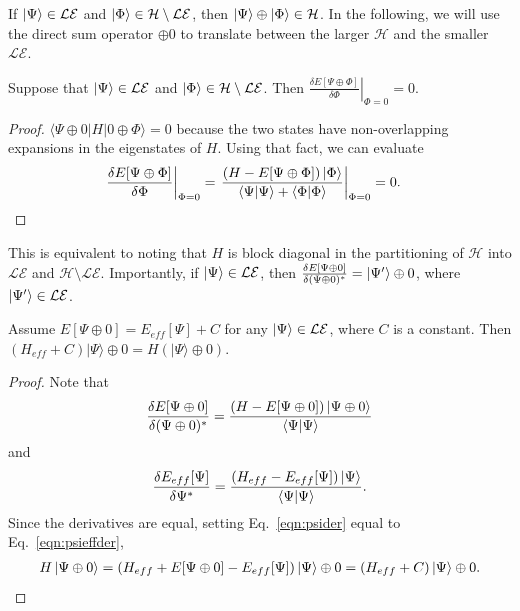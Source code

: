 \documentclass[aps, prb, 11pt]{revtex4-1}
\begin{document}
If $\ket{\Psi}\in \mathcal{LE}$ and $\ket{\Phi}\in {\mathcal H} \setminus \mathcal{LE}$, then $\ket{\Psi} \oplus \ket{\Phi} \in {\mathcal H}$.
In the following, we will use the direct sum operator $\oplus 0$ to translate between the larger ${\mathcal H}$ and the smaller $\mathcal{LE}$. 

\begin{lemma}
\label{lemma:zeroderiv}
Suppose that $\ket{\Psi}\in \mathcal{LE}$ and $\ket{\Phi} \in {\mathcal H} \setminus \mathcal{LE}$. 
Then $\left.\frac{\delta E[\Psi \oplus \Phi]}{\delta \Phi}\right|_{\Phi=0}=0$. 
\end{lemma}
\begin{proof}
$\langle \Psi\oplus 0 | H | 0\oplus \Phi \rangle=0$ because the two states have non-overlapping expansions in the eigenstates of $H$. 
Using that fact, we can evaluate
\begin{align}
\left.\frac{\delta E[\Psi \oplus \Phi]}{\delta \Phi}\right|_{\Phi=0} &= \left.\frac{\left(H-E[\Psi\oplus\Phi]\right) \ket{\Phi} }{\braket{\Psi|\Psi} + \braket{\Phi|\Phi}} \right|_{\Phi=0} = 0.
\end{align}
\end{proof}
This is equivalent to noting that $H$ is block diagonal in the partitioning of ${\mathcal H}$ into $\mathcal{LE}$ and ${\mathcal H} \setminus \mathcal{LE}$.
Importantly, if $\ket{\Psi} \in \mathcal{LE}$, then $\frac{\delta  E[\Psi\oplus 0] }{\delta (\Psi\oplus 0)^*} = \ket{\Psi'} \oplus 0$, where $\ket{\Psi'} \in \mathcal{LE} $. 

\begin{theorem}
\label{theorem:matching}
Assume $ E[\Psi\oplus 0]  = E_{eff}[\Psi]+C$ for any $\ket{\Psi } \in \mathcal{LE}$, where $C$ is a constant. 
Then $(H_{eff}+C)|\Psi\rangle\oplus 0 = H (|\Psi\rangle \oplus 0)$.
\end{theorem}
\begin{proof}
Note that
\begin{align}
	\frac{\delta E[\Psi\oplus 0]}{\delta (\Psi\oplus 0)^*}=\frac{(H-E[\Psi\oplus 0])\ket{\Psi\oplus 0} }{\braket{\Psi|\Psi}}
	\label{eqn:psider}
\end{align}
and 
\begin{align}
	\frac{\delta E_{eff}[\Psi]}{\delta \Psi^*}=\frac{(H_{eff}-E_{eff}[\Psi])\ket{\Psi} }{\braket{\Psi|\Psi}}.
	\label{eqn:psieffder}
\end{align}
Since the derivatives are equal, setting Eq.~\eqref{eqn:psider} equal to Eq.~\eqref{eqn:psieffder},
\begin{align}
	 H\ket{\Psi\oplus 0}= (H_{eff}+E[\Psi\oplus 0]-E_{eff}[\Psi])\ket{\Psi}\oplus 0 =(H_{eff}+C)\ket{\Psi}\oplus 0.
\end{align}
\end{proof}
\end{document}
